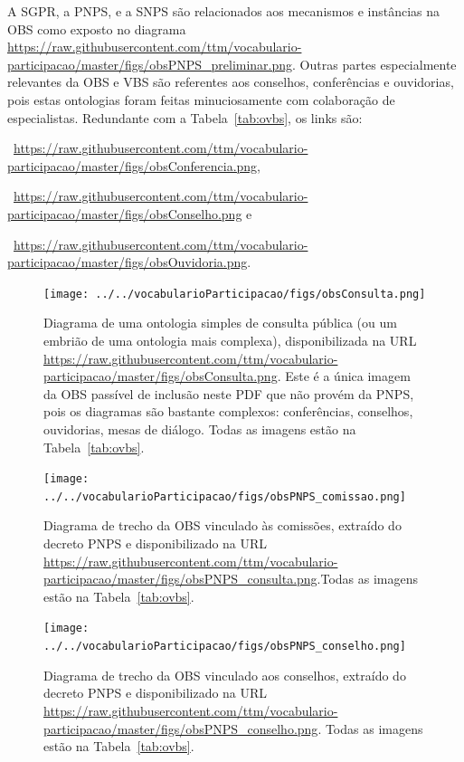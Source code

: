 \documentclass[12pt]{article}
\begin{document}
A SGPR, a PNPS, e a SNPS são relacionados aos mecanismos e instâncias na OBS como exposto no diagrama \url{https://raw.githubusercontent.com/ttm/vocabulario-participacao/master/figs/obsPNPS_preliminar.png}. Outras partes especialmente relevantes da OBS e VBS são referentes aos conselhos, conferências e ouvidorias, pois estas ontologias foram feitas minuciosamente com colaboração de especialistas. Redundante com a Tabela~\ref{tab:ovbs}, os links são:


{\footnotesize
~\url{https://raw.githubusercontent.com/ttm/vocabulario-participacao/master/figs/obsConferencia.png},

~\url{https://raw.githubusercontent.com/ttm/vocabulario-participacao/master/figs/obsConselho.png} e

~\url{https://raw.githubusercontent.com/ttm/vocabulario-participacao/master/figs/obsOuvidoria.png}.
}

\newpage


\begin{figure}[h!]
  \centering
    \texttt{[image: ../../vocabularioParticipacao/figs/obsConsulta.png]}
  \caption{Diagrama de uma ontologia simples de consulta pública (ou um embrião de uma ontologia mais complexa), disponibilizada na URL \url{https://raw.githubusercontent.com/ttm/vocabulario-participacao/master/figs/obsConsulta.png}. Este é a única imagem da OBS passível de inclusão neste PDF que não provém da PNPS, pois os diagramas são bastante complexos: conferências, conselhos, ouvidorias, mesas de diálogo. Todas as imagens estão na Tabela~\ref{tab:ovbs}.}\label{fig:1}
\end{figure}


\begin{figure}[h!]
  \centering
    \texttt{[image: ../../vocabularioParticipacao/figs/obsPNPS\_comissao.png]}
  \caption{Diagrama de trecho da OBS vinculado às comissões, extraído do decreto PNPS e disponibilizado na URL \url{https://raw.githubusercontent.com/ttm/vocabulario-participacao/master/figs/obsPNPS_consulta.png}.Todas as imagens estão na Tabela~\ref{tab:ovbs}.}\label{fig:2}
\end{figure}


\begin{figure}[h!]
  \centering
    \texttt{[image: ../../vocabularioParticipacao/figs/obsPNPS\_conselho.png]}
  \caption{Diagrama de trecho da OBS vinculado aos conselhos, extraído do decreto PNPS e disponibilizado na URL \url{https://raw.githubusercontent.com/ttm/vocabulario-participacao/master/figs/obsPNPS_conselho.png}. Todas as imagens estão na Tabela~\ref{tab:ovbs}.}\label{fig:3}
\end{figure}
\end{document}
